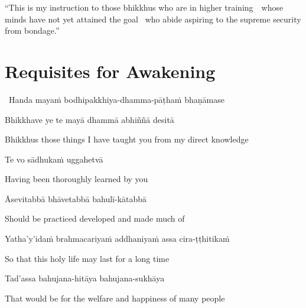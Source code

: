 \suttaRef{[MN 39]}

\begin{english-only-justify}
  ``This is my instruction to those bhikkhus who are in higher \mbox{training}~\breathmark\ whose minds have not yet attained the goal \breathmark\ who abide aspiring to the supreme security from bondage.''
\end{english-only-justify}

\suttaRef{[MN 107]}


\section{Requisites for Awakening}
\label{requisites-for-awakening}

\begin{leader}
  \anglebracketleft\ \hspace{-0.5mm}Handa mayaṁ bodhipakkhiya-dhamma-pāṭhaṁ bhaṇāmase \hspace{-0.5mm}\anglebracketright\
\end{leader}

Bhikkhave ye te mayā dhammā abhiññā desitā

\begin{english}
  Bhikkhus those things I have taught you from my direct knowledge
\end{english}

Te vo sādhukaṁ uggahetvā

\begin{english}
  Having been thoroughly learned by you
\end{english}

Āsevitabbā bhāvetabbā bahulī-kātabbā

\begin{english}
  Should be practiced developed and made much of
\end{english}

Yatha'y'idaṁ brahmacariyaṁ addhaniyaṁ assa cira-ṭṭhitikaṁ

\begin{english}
  So that this holy life may last for a long time
\end{english}

Tad'assa bahujana-hitāya bahujana-sukhāya

\begin{english}
  That would be for the welfare and happiness of many people
\end{english}

